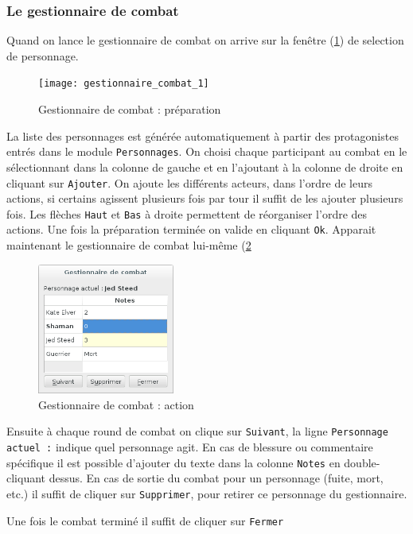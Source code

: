 \documentclass[a4paper,12pt]{article}
\newcommand*{\interfaceitem}[1]{\texttt{#1}}
\begin{document}
\subsubsection{Le gestionnaire de combat}
Quand on lance le gestionnaire de combat on arrive sur la fenêtre (\ref{gestion_combat_choix}) de selection de personnage.
\begin{figure}[h]
    \texttt{[image: gestionnaire\_combat\_1]}
    \caption{Gestionnaire de combat : préparation}
    \label{gestion_combat_choix}
\end{figure}
La liste des personnages est générée automatiquement à partir des protagonistes entrés dans le module \interfaceitem{Personnages}.
On choisi chaque participant au combat en le sélectionnant dans la colonne de gauche et en l'ajoutant à la colonne de droite en cliquant sur \interfaceitem{Ajouter}.
On ajoute les différents acteurs, dans l’ordre de leurs actions, si certains
agissent plusieurs fois par tour il suffit de les ajouter plusieurs fois. Les flèches \interfaceitem{Haut} et \interfaceitem{Bas} à droite permettent de réorganiser l’ordre des actions.
Une fois la préparation terminée on valide en cliquant \interfaceitem{Ok}.
Apparait maintenant le gestionnaire de combat lui-même (\ref{gestion_combat_fight}
\begin{figure}[h]
    \includegraphics[width=0.4\textwidth]{gestion_combat_fight}
    \caption{Gestionnaire de combat : action}
    \label{gestion_combat_fight}
\end{figure}
Ensuite à chaque round de combat on clique sur \interfaceitem{Suivant}, la ligne \interfaceitem{Personnage actuel :} indique quel personnage agit. En cas de blessure ou commentaire spécifique il est possible d'ajouter du texte dans la colonne \interfaceitem{Notes} en double-cliquant dessus.
En cas de sortie du combat pour un personnage (fuite, mort, etc.) il suffit de cliquer sur \interfaceitem{Supprimer}, pour retirer ce personnage du gestionnaire.

Une fois le combat terminé il suffit de cliquer sur \interfaceitem{Fermer}
\end{document}
